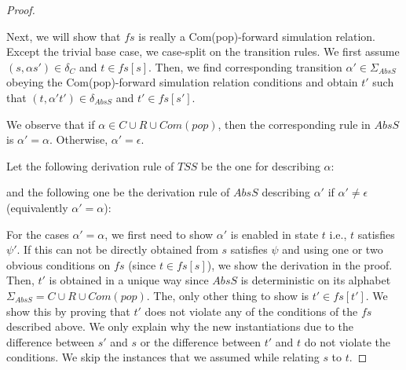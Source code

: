 \documentclass{article}
\begin{document}
\begin{proof}
\begin{itemize}
\end{itemize}
Next, we will show that $fs$ is really a Com(pop)-forward simulation relation. Except the trivial base case, we case-split on the transition rules. We first assume $(s, \alpha s') \in \delta_C$ and $t \in fs[s]$. Then, we find  corresponding transition $\alpha' \in \Sigma_{AbsS}$ obeying the Com(pop)-forward simulation relation conditions and obtain $t'$ such that $(t, \alpha' t') \in \delta_{AbsS}$  and $t' \in fs[s']$.

We observe that if $\alpha \in C \cup R \cup Com(pop)$, then the corresponding rule in $AbsS$ is $\alpha' = \alpha$. Otherwise, $\alpha' = \epsilon$.

Let the following derivation rule of $TSS$ be the one for describing $\alpha$:
\begin{mathpar}
\end{mathpar}
and the following one be the derivation rule of $AbsS$ describing $\alpha'$ if $\alpha' \neq \epsilon$ (equivalently $\alpha' = \alpha$):
\begin{mathpar}
\end{mathpar}
For the cases $\alpha' = \alpha$, we first need to show $\alpha'$ is enabled in state $t$ i.e., $t$ satisfies $\psi'$. If this can not be directly obtained from $s$ satisfies $\psi$ and using one or two obvious conditions on $fs$ (since $t \in fs[s]$), we show the derivation in the proof. Then, $t'$ is obtained in a unique way since $AbsS$ is deterministic on its alphabet $ \Sigma_{AbsS} = C \cup R \cup Com(pop)$. The, only other thing to show is $t' \in fs[t']$. We show this by proving that $t'$ does not violate any of the conditions of the $fs$ described above. We only explain why the new instantiations due to the difference between $s'$ and $s$ or the difference between $t'$ and $t$ do not violate the conditions. We skip the instances that we assumed while relating $s$ to $t$.


\end{proof}
\end{document}
